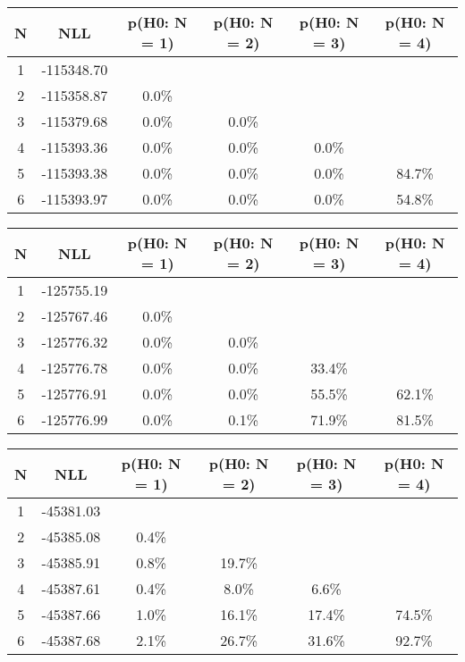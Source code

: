 \begin{table}[htb]
	\begin{center}
{\footnotesize\renewcommand{\arraystretch}{1.4}
		\begin{tabular}{cc||cccc}
			N & NLL & p(H0: N = 1) & p(H0: N = 2) & p(H0: N = 3) & p(H0: N = 4)\\ 
		\hline
1 & -115348.70 & & & & \\
2 & -115358.87 & 0.0\% & & & \\
3 & -115379.68 & 0.0\% & 0.0\% & & \\
4 & -115393.36 & 0.0\% & 0.0\% & 0.0\% & \\
5 & -115393.38 & 0.0\% & 0.0\% & 0.0\% & 84.7\% \\
6 & -115393.97 & 0.0\% & 0.0\% & 0.0\% & 54.8\% \\
	\end{tabular}
		\label{tab:lab}
	}
	\end{center}\end{table}

\begin{table}[htb]
	\begin{center}
{\footnotesize\renewcommand{\arraystretch}{1.4}
		\begin{tabular}{cc||cccc}
			N & NLL & p(H0: N = 1) & p(H0: N = 2) & p(H0: N = 3) & p(H0: N = 4)\\ 
		\hline
1 & -125755.19 & & & & \\
2 & -125767.46 & 0.0\% & & & \\
3 & -125776.32 & 0.0\% & 0.0\% & & \\
4 & -125776.78 & 0.0\% & 0.0\% & 33.4\% & \\
5 & -125776.91 & 0.0\% & 0.0\% & 55.5\% & 62.1\% \\
6 & -125776.99 & 0.0\% & 0.1\% & 71.9\% & 81.5\% \\
	\end{tabular}
		\label{tab:lab}
	}
	\end{center}\end{table}

\begin{table}[htb]
	\begin{center}
{\footnotesize\renewcommand{\arraystretch}{1.4}
		\begin{tabular}{cc||cccc}
			N & NLL & p(H0: N = 1) & p(H0: N = 2) & p(H0: N = 3) & p(H0: N = 4)\\ 
		\hline
1 & -45381.03 & & & & \\
2 & -45385.08 & 0.4\% & & & \\
3 & -45385.91 & 0.8\% & 19.7\% & & \\
4 & -45387.61 & 0.4\% & 8.0\% & 6.6\% & \\
5 & -45387.66 & 1.0\% & 16.1\% & 17.4\% & 74.5\% \\
6 & -45387.68 & 2.1\% & 26.7\% & 31.6\% & 92.7\% \\
	\end{tabular}
		\label{tab:lab}
	}
	\end{center}\end{table}

